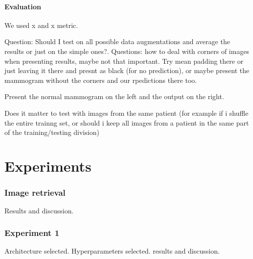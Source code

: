 \documentclass[11pt]{article}
\begin{document}
	\subsection{Evaluation}
We used x and x metric.

	Question: Should I test on all possible data augmentations and average the results or just on the simple ones?.	
	Questions: how to deal with corners of images when presenting results, maybe not that important. Try mean padding there or just leaving it there and presnt as black (for no prediction), or maybe present the mammogram without the corners and our rpedictions there too.

	Present the normal mammogram on the left and the output on the right.

	Does it matter to test with images from the same patient (for example if i shuffle the entire trainng set, or should i keep all images from a patient in the same part of the training/testing division)
	

	\part{Experiments}
	\section{Image retrieval}
	Results and discussion.
	\section{Experiment 1}
	Architecture selected. Hyperparameters selected. results and discussion.

	
	
	
\end{document}
